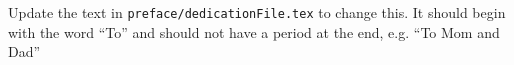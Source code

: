 Update the text in \verb|preface/dedicationFile.tex| to change this.
\break
\break
It should begin with the word ``To'' and should not have a period at the end, e.g. ``To Mom and Dad''